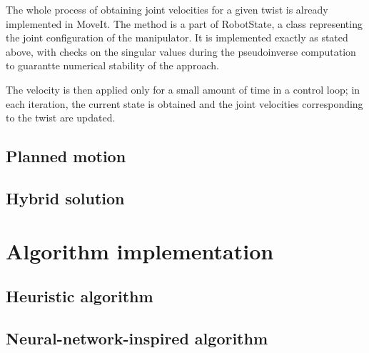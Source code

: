 \documentclass[buriama8_dp.tex]{subfiles}
\begin{document}
The whole process of obtaining joint velocities for a given twist is already implemented in MoveIt. The method is a part of RobotState, a class representing the joint configuration of the manipulator. It is implemented exactly as stated above, with checks on the singular values during the pseudoinverse computation to guarantte numerical stability of the approach.

The velocity is then applied only for a small amount of time in a control loop; in each iteration, the current state is obtained and the joint velocities corresponding to the twist are updated.

\subsection{Planned motion}
\label{subsec:impl_drv_plan}


\subsection{Hybrid solution}
\label{subsec:impl_drv}




\section{Algorithm implementation}
\label{sec:alg_impl}

\subsection{Heuristic algorithm}
\label{subsec:impl_heur}

\subsection{Neural-network-inspired algorithm}
\label{subsec:impl_neuro}
\end{document}
